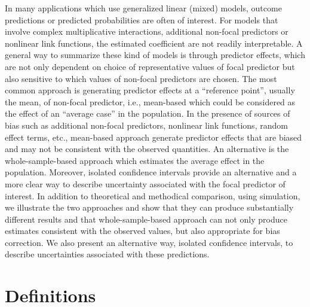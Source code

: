 \documentclass[10pt,letterpaper]{article}
\begin{document}
In many applications which use generalized linear (mixed) models, outcome predictions or predicted probabilities are often of interest. For models that involve complex multiplicative interactions, additional non-focal predictors or nonlinear link functions, the estimated coefficient are not readily interpretable. A general way to summarize these kind of models is through predictor effects, which are not only dependent on choice of representative values of focal predictor but also sensitive to which values of non-focal predictors are chosen. The most common approach is generating predictor effects at a ``reference point'', usually the mean, of non-focal predictor, i.e., mean-based which could be considered as the effect of an ``average case'' in the population. In the presence of sources of bias such as additional non-focal predictors, nonlinear link functions, random effect terms, etc., mean-based approach generate predictor effects that are biased and may not be consistent with the observed quantities. An alternative is the whole-sample-based approach which estimates the average effect in the population. Moreover, isolated confidence intervals provide an alternative and a more clear way to describe uncertainty associated with the focal predictor of interest. In addition to theoretical and methodical comparison, using simulation, we illustrate the two approaches and show that they can produce substantially different results and that whole-sample-based approach can not only produce estimates consistent with the observed values, but also appropriate for bias correction. We also present an alternative way, isolated confidence intervals, to describe uncertainties associated with these predictions.

\section*{Definitions}
\end{document}

